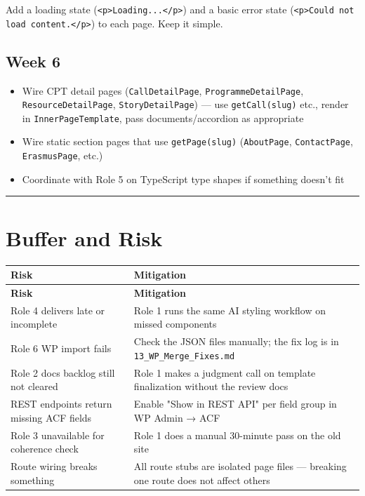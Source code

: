 \documentclass[11pt,a4paper]{article}
\newcommand{\grouprule}{\vspace{0.3em}\textcolor{ruleLine}{\rule{\linewidth}{0.4pt}}\vspace{0.3em}}
\begin{document}
Add a loading state (\nolinkurl{<p>Loading...</p>}) and a basic error state (\nolinkurl{<p>Could not load content.</p>}) to each page. Keep it simple.

\subsection{Week 6}

\begin{itemize}
\item Wire CPT detail pages (\nolinkurl{CallDetailPage}, \nolinkurl{ProgrammeDetailPage}, \nolinkurl{ResourceDetailPage}, \nolinkurl{StoryDetailPage}) — use \nolinkurl{getCall(slug)} etc., render in \nolinkurl{InnerPageTemplate}, pass documents/accordion as appropriate
\item Wire static section pages that use \nolinkurl{getPage(slug)} (\nolinkurl{AboutPage}, \nolinkurl{ContactPage}, \nolinkurl{ErasmusPage}, etc.)
\item Coordinate with Role 5 on TypeScript type shapes if something doesn't fit
\end{itemize}

\grouprule

\section{Buffer and Risk}

\begin{longtable}{@{}p{7.2cm}p{7.2cm}@{}}
\rowcolor{uvtLightBlue}
\textbf{Risk} & \textbf{Mitigation} \\
\midrule
\endfirsthead
\rowcolor{uvtLightBlue}
\textbf{Risk} & \textbf{Mitigation} \\
\midrule
\endhead
Role 4 delivers late or incomplete & Role 1 runs the same AI styling workflow on missed components \\
Role 6 WP import fails & Check the JSON files manually; the fix log is in \nolinkurl{13_WP_Merge_Fixes.md} \\
Role 2 docs backlog still not cleared & Role 1 makes a judgment call on template finalization without the review docs \\
REST endpoints return missing ACF fields & Enable "Show in REST API" per field group in WP Admin → ACF \\
Role 3 unavailable for coherence check & Role 1 does a manual 30-minute pass on the old site \\
Route wiring breaks something & All route stubs are isolated page files — breaking one route does not affect others \\
\end{longtable}
\end{document}

